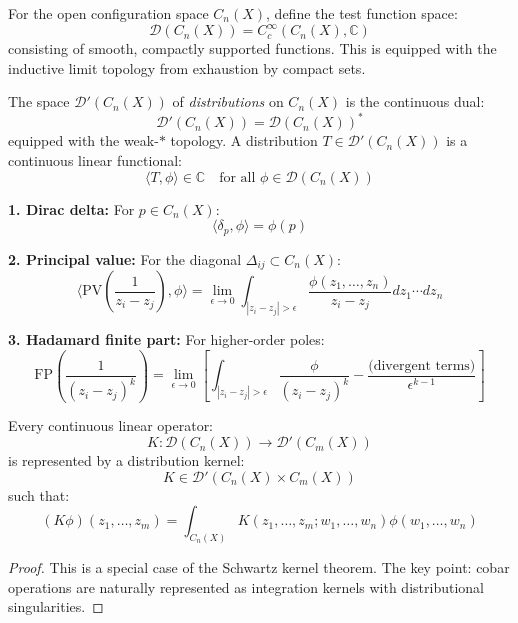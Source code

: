 \begin{definition}\label{def:test-functions}
For the open configuration space $C_n(X)$, define the test function space:
$$\mathcal{D}(C_n(X)) = C_c^\infty(C_n(X), \mathbb{C})$$
consisting of smooth, compactly supported functions. This is equipped with the 
inductive limit topology from exhaustion by compact sets.
\end{definition}

\begin{definition}\label{def:distributions}
The space $\mathcal{D}'(C_n(X))$ of \emph{distributions} on $C_n(X)$ is the 
continuous dual:
$$\mathcal{D}'(C_n(X)) = \mathcal{D}(C_n(X))^*$$
equipped with the weak-$*$ topology. A distribution $T \in \mathcal{D}'(C_n(X))$ 
is a continuous linear functional:
$$\langle T, \phi \rangle \in \mathbb{C} \quad \text{for all } \phi \in \mathcal{D}(C_n(X))$$
\end{definition}

\begin{example}\label{ex:fundamental-distributions}
\textbf{1. Dirac delta:} For $p \in C_n(X)$:
$$\langle \delta_p, \phi \rangle = \phi(p)$$

\textbf{2. Principal value:} For the diagonal $\Delta_{ij} \subset C_n(X)$:
$$\langle \text{PV}\left(\frac{1}{z_i - z_j}\right), \phi \rangle = 
\lim_{\epsilon \to 0} \int_{|z_i - z_j| > \epsilon} \frac{\phi(z_1, \ldots, z_n)}{z_i - z_j} 
dz_1 \cdots dz_n$$

\textbf{3. Hadamard finite part:} For higher-order poles:
$$\text{FP}\left(\frac{1}{(z_i - z_j)^k}\right) = 
\lim_{\epsilon \to 0} \left[\int_{|z_i - z_j| > \epsilon} \frac{\phi}{(z_i - z_j)^k} - 
\frac{\text{(divergent terms)}}{\epsilon^{k-1}}\right]$$
\end{example}

\begin{theorem}\label{thm:schwartz-kernel-cobar}
Every continuous linear operator:
$$K: \mathcal{D}(C_n(X)) \to \mathcal{D}'(C_m(X))$$
is represented by a distribution kernel:
$$K \in \mathcal{D}'(C_n(X) \times C_m(X))$$
such that:
$$(K\phi)(z_1, \ldots, z_m) = \int_{C_n(X)} K(z_1, \ldots, z_m; w_1, \ldots, w_n) \phi(w_1, \ldots, w_n)$$
\end{theorem}

\begin{proof}
This is a special case of the Schwartz kernel theorem. The key point: cobar operations 
are naturally represented as integration kernels with distributional singularities.
\end{proof}

